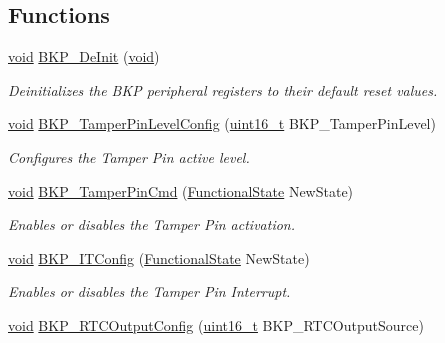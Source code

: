 \subsection*{Functions}
\begin{DoxyCompactItemize}
\item 
\hyperlink{usb__devapi_8h_afabf60e7f57651d6d595a02c75f07cd0}{void} \hyperlink{group___b_k_p___exported___functions_gaabff4d8f5ebf4fd9a840bcc9042ca226}{B\+K\+P\+\_\+\+De\+Init} (\hyperlink{usb__devapi_8h_afabf60e7f57651d6d595a02c75f07cd0}{void})
\begin{DoxyCompactList}\small\item\em Deinitializes the B\+KP peripheral registers to their default reset values. \end{DoxyCompactList}\item 
\hyperlink{usb__devapi_8h_afabf60e7f57651d6d595a02c75f07cd0}{void} \hyperlink{group___b_k_p___exported___functions_gae216446d641d075fb575ce6dbe2ff4c1}{B\+K\+P\+\_\+\+Tamper\+Pin\+Level\+Config} (\hyperlink{_p_e___types_8h_a1f1825b69244eb3ad2c7165ddc99c956}{uint16\+\_\+t} B\+K\+P\+\_\+\+Tamper\+Pin\+Level)
\begin{DoxyCompactList}\small\item\em Configures the Tamper Pin active level. \end{DoxyCompactList}\item 
\hyperlink{usb__devapi_8h_afabf60e7f57651d6d595a02c75f07cd0}{void} \hyperlink{group___b_k_p___exported___functions_ga3a0cdff9ad8238ade2c67e2b70f530ac}{B\+K\+P\+\_\+\+Tamper\+Pin\+Cmd} (\hyperlink{agilefox_2library_2inc_2stm32f10x__type_8h_ac9a7e9a35d2513ec15c3b537aaa4fba1}{Functional\+State} New\+State)
\begin{DoxyCompactList}\small\item\em Enables or disables the Tamper Pin activation. \end{DoxyCompactList}\item 
\hyperlink{usb__devapi_8h_afabf60e7f57651d6d595a02c75f07cd0}{void} \hyperlink{group___b_k_p___exported___functions_gab8dbd0c4773f6edb98a28c8ff6a2ead0}{B\+K\+P\+\_\+\+I\+T\+Config} (\hyperlink{agilefox_2library_2inc_2stm32f10x__type_8h_ac9a7e9a35d2513ec15c3b537aaa4fba1}{Functional\+State} New\+State)
\begin{DoxyCompactList}\small\item\em Enables or disables the Tamper Pin Interrupt. \end{DoxyCompactList}\item 
\hyperlink{usb__devapi_8h_afabf60e7f57651d6d595a02c75f07cd0}{void} \hyperlink{group___b_k_p___exported___functions_ga3d1b22b3c6a79f7b423616a0af1885bf}{B\+K\+P\+\_\+\+R\+T\+C\+Output\+Config} (\hyperlink{_p_e___types_8h_a1f1825b69244eb3ad2c7165ddc99c956}{uint16\+\_\+t} B\+K\+P\+\_\+\+R\+T\+C\+Output\+Source)

\end{DoxyCompactItemize}
